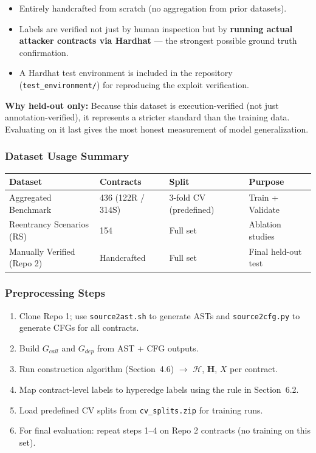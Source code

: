 \documentclass[11pt]{article}
\begin{document}
\begin{itemize}
    \item Entirely handcrafted from scratch (no aggregation from prior datasets).
    \item Labels are verified not just by human inspection but by \textbf{running actual attacker contracts via Hardhat} --- the strongest possible ground truth confirmation.
    \item A Hardhat test environment is included in the repository (\texttt{test\_environment/}) for reproducing the exploit verification.
\end{itemize}

\textbf{Why held-out only:} Because this dataset is execution-verified (not just annotation-verified), it represents a stricter standard than the training data. Evaluating on it last gives the most honest measurement of model generalization.

\subsubsection{Dataset Usage Summary}

\begin{center}
\begin{tabular}{llll}
\toprule
\textbf{Dataset} & \textbf{Contracts} & \textbf{Split} & \textbf{Purpose} \\
\midrule
Aggregated Benchmark & 436 (122R / 314S) & 3-fold CV (predefined) & Train + Validate \\
Reentrancy Scenarios (RS) & 154 & Full set & Ablation studies \\
Manually Verified (Repo 2) & Handcrafted & Full set & Final held-out test \\
\bottomrule
\end{tabular}
\end{center}

\subsubsection{Preprocessing Steps}

\begin{enumerate}
    \item Clone Repo 1; use \texttt{source2ast.sh} to generate ASTs and \texttt{source2cfg.py} to generate CFGs for all contracts.
    \item Build $G_{call}$ and $G_{dep}$ from AST + CFG outputs.
    \item Run construction algorithm (Section~4.6) $\to$ $\mathcal{H}$, $\mathbf{H}$, $X$ per contract.
    \item Map contract-level labels to hyperedge labels using the rule in Section~6.2.
    \item Load predefined CV splits from \texttt{cv\_splits.zip} for training runs.
    \item For final evaluation: repeat steps 1--4 on Repo 2 contracts (no training on this set).
\end{enumerate}
\end{document}
